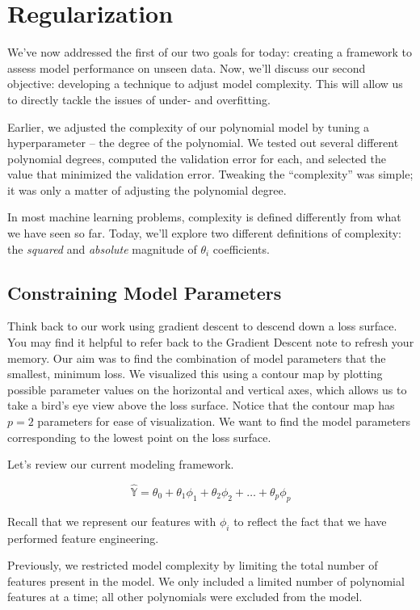 \documentclass[
  letterpaper,
  DIV=11,
  numbers=noendperiod]{scrreprt}
\begin{document}
\section{Regularization}\label{regularization}

We've now addressed the first of our two goals for today: creating a
framework to assess model performance on unseen data. Now, we'll discuss
our second objective: developing a technique to adjust model complexity.
This will allow us to directly tackle the issues of under- and
overfitting.

Earlier, we adjusted the complexity of our polynomial model by tuning a
hyperparameter -- the degree of the polynomial. We tested out several
different polynomial degrees, computed the validation error for each,
and selected the value that minimized the validation error. Tweaking the
``complexity'' was simple; it was only a matter of adjusting the
polynomial degree.

In most machine learning problems, complexity is defined differently
from what we have seen so far. Today, we'll explore two different
definitions of complexity: the \emph{squared} and \emph{absolute}
magnitude of \(\theta_i\) coefficients.

\subsection{Constraining Model
Parameters}\label{constraining-model-parameters}

Think back to our work using gradient descent to descend down a loss
surface. You may find it helpful to refer back to the Gradient Descent
note to refresh your memory. Our aim was to find the combination of
model parameters that the smallest, minimum loss. We visualized this
using a contour map by plotting possible parameter values on the
horizontal and vertical axes, which allows us to take a bird's eye view
above the loss surface. Notice that the contour map has \(p=2\)
parameters for ease of visualization. We want to find the model
parameters corresponding to the lowest point on the loss surface.

Let's review our current modeling framework.

\[\hat{\mathbb{Y}} = \theta_0 + \theta_1 \phi_1 + \theta_2 \phi_2 + \ldots + \theta_p \phi_p\]

Recall that we represent our features with \(\phi_i\) to reflect the
fact that we have performed feature engineering.

Previously, we restricted model complexity by limiting the total number
of features present in the model. We only included a limited number of
polynomial features at a time; all other polynomials were excluded from
the model.
\end{document}
